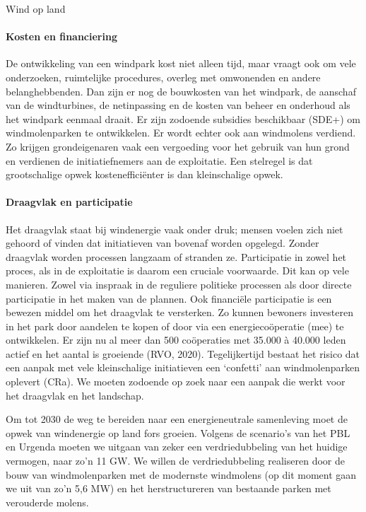 \begin{voorstel}{Wind op land}
\begin{overwegingen}
\paragraph{Kosten en financiering}
De ontwikkeling van een windpark kost niet alleen tijd, maar vraagt ook om vele onderzoeken, ruimtelijke procedures, overleg met omwonenden en andere belanghebbenden. Dan zijn er nog de bouwkosten van het windpark, de aanschaf van de windturbines, de netinpassing en de kosten van beheer en onderhoud als het windpark eenmaal draait. Er zijn zodoende subsidies beschikbaar (SDE+) om windmolenparken te ontwikkelen. Er wordt echter ook aan windmolens verdiend. Zo krijgen grondeigenaren vaak een vergoeding voor het gebruik van hun grond en verdienen de initiatiefnemers aan de exploitatie. Een stelregel is dat grootschalige opwek kostenefficiënter is dan kleinschalige opwek.

\paragraph{Draagvlak en participatie}
Het draagvlak staat bij windenergie vaak onder druk; mensen voelen zich niet gehoord of vinden dat initiatieven van bovenaf worden opgelegd. Zonder draagvlak worden processen langzaam of stranden ze. Participatie in zowel het proces, als in de exploitatie is daarom een cruciale voorwaarde. Dit kan op vele manieren. Zowel via inspraak in de reguliere politieke processen als door directe participatie in het maken van de plannen. Ook financiële participatie is een bewezen middel om het draagvlak te versterken. Zo kunnen bewoners investeren in het park door aandelen te kopen of door via een energiecoöperatie (mee) te ontwikkelen. Er zijn nu al meer dan 500 coöperaties met 35.000 à 40.000 leden actief en het aantal is groeiende (RVO, 2020). Tegelijkertijd bestaat het risico dat een aanpak met vele kleinschalige initiatieven een ‘confetti’ aan windmolenparken oplevert (CRa). We moeten zodoende op zoek naar een aanpak die werkt voor het draagvlak en het landschap.
\end{overwegingen}

\begin{aanbevelingen}
Om tot 2030 de weg te bereiden naar een energieneutrale samenleving moet de opwek van windenergie op land fors groeien. Volgens de scenario’s van het PBL en Urgenda moeten we uitgaan van zeker een verdriedubbeling van het huidige vermogen, naar zo’n 11 GW. We willen de verdriedubbeling realiseren door de bouw van windmolenparken met de modernste windmolens (op dit moment gaan we uit van zo’n 5,6 MW) en het herstructureren van bestaande parken met verouderde molens.


\end{aanbevelingen}
\end{voorstel}
